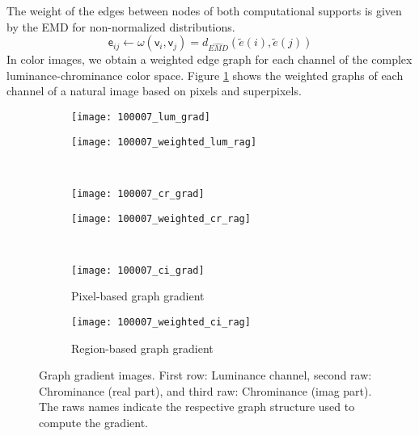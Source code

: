 The weight of the edges between nodes of both computational supports is given by the EMD for non-normalized distributions. 
\begin{equation}
	\mathsf{e}_{ij} \leftarrow \omega(\mathsf{v}_i, \mathsf{v}_j) = d_{\widehat{EMD}}(\widetilde{e}(i), \widetilde{e}(j))
\end{equation}
In color images, we obtain a weighted edge graph for each channel of the complex luminance-chrominance color space. Figure \ref{fig:graph_gradient_pixel_superpixel} shows the weighted graphs of each channel of a natural image based on pixels and superpixels. 

\begin{figure}[!ht]
    \centering
    \begin{subfigure}[b]{0.49\textwidth}
    	\texttt{[image: 100007\_lum\_grad]} 
    \end{subfigure}         
    \begin{subfigure}[b]{0.49\textwidth}
        \texttt{[image: 100007\_weighted\_lum\_rag]}
    \end{subfigure}\\ [1ex]    
    \begin{subfigure}[b]{0.49\textwidth}
        \texttt{[image: 100007\_cr\_grad]}
    \end{subfigure}     
    \begin{subfigure}[b]{0.49\textwidth}
    	\texttt{[image: 100007\_weighted\_cr\_rag]} 
    \end{subfigure}\\ [1ex]          
    \begin{subfigure}[b]{0.49\textwidth}
        \texttt{[image: 100007\_ci\_grad]}
        \caption{Pixel-based graph gradient}
    \end{subfigure}   
    \begin{subfigure}[b]{0.49\textwidth}
        \texttt{[image: 100007\_weighted\_ci\_rag]}
        \caption{Region-based graph gradient}
    \end{subfigure}
    
	\caption{Graph gradient images. First row: Luminance channel, second raw: Chrominance (real part), and third raw: Chrominance (imag part). The raws names indicate the respective graph structure used to compute the gradient.}\label{fig:graph_gradient_pixel_superpixel}    
\end{figure}

